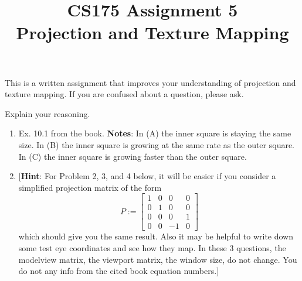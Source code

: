 \documentclass[letterpaper, 11pt]{article}
\title{CS175 Assignment 5\\ Projection and Texture Mapping}
\date{}                                           %
\begin{document}
\maketitle

This is a written assignment that improves your understanding of
projection and texture mapping.
If you are confused about a question, please ask.

Explain your reasoning.
\begin{enumerate}

\item Ex. 10.1 from the book.
{\bf Notes}: In (A) the inner square is staying the same size.
In (B) the inner square is growing at the same rate as the outer square.
In (C) the inner square is growing faster than  the outer square.



\item{} [{\bf Hint}: For Problem 2, 3, and 4 below, it will be easier if
  you consider a simplified projection matrix of the form
$$P:=\left[
\begin{array}{cccc}
  1 & 0 & 0 & 0 \\
  0 & 1 & 0 & 0 \\
  0 & 0 & 0 & 1 \\
  0 & 0 & -1 & 0
\end{array}
\right]$$ which should give you the same result. Also it may be helpful
to write down some test eye coordinates and see how they map.
In these 3 questions, the modelview matrix, the viewport matrix,
the window size, do not change. You do not any info from the cited book equation numbers.]



\end{enumerate}
\end{document}
